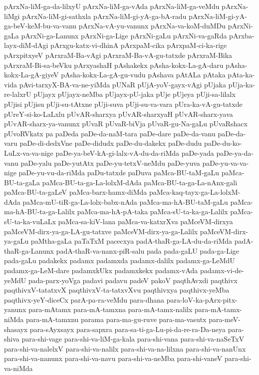 {pArxNa-liM-ga-da-lilxyU
pArxNa-liM-ga-vAda
pArxNa-liM-ga-veMdu
pArxNa-liMgi
pArxNa-liM-gi-sathxla
pArxNa-liM-gi-yA-ga-bA-radu
pArxNa-liM-gi-yA-ga-beV-keM-bu-va-vanu
pArxNa-vA-yu-vanunx
pArxNa-va-koM-duMDu
pArxNi-gaLa
pArxNi-ga-Lanunx
pArxNi-ga-Lige
pArxNi-gaLu
pArxNi-va-gaRda
pArxba-layx-diM-dAgi
pArxgu-katx-vi-dhinA
pArxpaM-cika
pArxpaM-ci-ka-rige
pArxpitxyeV
pArxraM-Ba-vAgi
pArxraM-Ba-vA-gu-tatxde
pArxraM-Bika
pArxraM-Bi-sa-beVku
pArxyashaH
pAshakekx
pAsha-kokx-La-gA-daru
pAsha-kokx-La-gA-giyeV
pAsha-kokx-La-gA-gu-vudu
pAshava
pAtALa
pAtaka
pAta-ka-vida
pAvi-tarxyX-BA-va-ne-yiMda
pUNaR
pUjA-yoV-gayx-vAgi
pUjaka
pUja-ka-re-lalxrU
pUjayx
pUjayx-neMba
pUjayx-pU-jaka
pUje
pUjeya
pUji-sa-lilalx
pUjisi
pUjisu
pUji-su-tAtxne
pUji-suva
pUji-su-va-vara
pUra-ka-vA-gu-tatxde
pUreY-si-ko-LaLxlu
pUvAR-sharxya
pUvAR-sharxyaH
pUvAR-sharx-yava
pUvAR-sharx-ya-vanunx
pUvaR
pUvaR-biVja
pUvaR-gu-Na-gaLu
pUvaRshacx
pUvoRVkatx
pa
paDeda
paDe-da-naM-tara
paDe-dare
paDe-da-vanu
paDe-da-varu
paDe-di-dedxVne
paDe-didudx
paDe-du-dakekx
paDe-dudu
paDe-du-ko-LuLx-va-va-nige
paDe-ya-beV-kA-gi-lalx-vA-du-da-riMda
paDe-yada
paDe-ya-da-vanu
paDe-yalu
paDe-yutAtx
paDe-yu-tetxV-neMdu
paDe-yuva
paDe-yu-va-va-nige
paDe-yu-vu-da-riMda
paDu-tatxde
paDuva
paMca-BU-taM-gaLu
paMca-BU-ta-gaLa
paMca-BU-ta-ga-La-lolxM-dAda
paMca-BU-ta-ga-La-nAnx-gali
paMca-BU-ta-gaLeV
paMca-barx-hamx-diMda
paMca-kaq-tayx-ga-La-lolxM-dAda
paMca-mU-tiR-ga-La-lolx-babx-nAda
paMca-ma-hA-BU-taM-gaLu
paMca-ma-hA-BU-ta-ga-Lalilx
paMca-ma-hA-pA-taka
paMca-sU-ta-ka-ga-Lalilx
paMca-sU-ta-ka-vuLaLx
paMca-sa-kiV-lana
paMca-va-katxrXva
paMceVM-dirxya
paMceVM-dirx-ya-ga-LA-gu-tatxve
paMceVM-dirx-ya-ga-Lalilx
paMceVM-dirx-ya-gaLu
paMtha-gaLa
paTaTxM
pacecxya
padA-thaR-ga-LA-du-da-riMda
padA-thaR-ga-Lanunx
padA-thaR-va-nanx-piR-salu
pada
pada-gaLU
pada-ga-Lige
pada-gaLu
padakekx
padamx
padamxda
padamx-dalilx
padamx-ga-LeMdU
padamx-ga-LeM-dare
padamxkUkx
padamxkekx
padamx-vAda
padamx-vi-de-yeMdU
pada-parx-yoVga
padavi
padavu
padeV
pakoV
paqthAvxdi
paqthivx
paqthivxV-tatatxvX
paqthivxV-ta-tatxvXvu
paqthivxya
paqthivx-yeMba
paqthivx-yeY-diceCx
parA-pa-ra-veMdu
para-dhana
para-loV-ka-pArx-pitx-yanunx
para-mAtamx
para-mA-tamxna
para-mA-tamx-nalilx
para-mA-tamx-niMda
para-mA-tamxnu
parama
para-ma-gu-ruve
para-ma-vasutx
para-meV-shasayx
para-sAyxsayx
para-sapxra
para-sa-ti-ga-Lu-pi-da-re-ra-Da-neya
para-shiva
para-shi-vage
para-shi-va-liM-ga-kala
para-shi-vana
para-shi-va-naSeTxV
para-shi-va-nalelxV
para-shi-va-nalilx
para-shi-va-na-lilxna
para-shi-va-nanUnx
para-shi-va-nanunx
para-shi-va-navu
para-shi-va-neMba
para-shi-vaneV
para-shi-va-niMda
}
